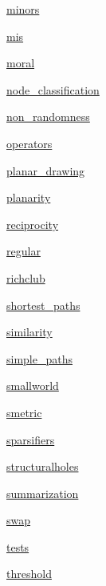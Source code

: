 \begin{DoxyCompactItemize}
\item 
 \hyperlink{namespacenetworkx_1_1algorithms_1_1minors}{minors}
\item 
 \hyperlink{namespacenetworkx_1_1algorithms_1_1mis}{mis}
\item 
 \hyperlink{namespacenetworkx_1_1algorithms_1_1moral}{moral}
\item 
 \hyperlink{namespacenetworkx_1_1algorithms_1_1node__classification}{node\+\_\+classification}
\item 
 \hyperlink{namespacenetworkx_1_1algorithms_1_1non__randomness}{non\+\_\+randomness}
\item 
 \hyperlink{namespacenetworkx_1_1algorithms_1_1operators}{operators}
\item 
 \hyperlink{namespacenetworkx_1_1algorithms_1_1planar__drawing}{planar\+\_\+drawing}
\item 
 \hyperlink{namespacenetworkx_1_1algorithms_1_1planarity}{planarity}
\item 
 \hyperlink{namespacenetworkx_1_1algorithms_1_1reciprocity}{reciprocity}
\item 
 \hyperlink{namespacenetworkx_1_1algorithms_1_1regular}{regular}
\item 
 \hyperlink{namespacenetworkx_1_1algorithms_1_1richclub}{richclub}
\item 
 \hyperlink{namespacenetworkx_1_1algorithms_1_1shortest__paths}{shortest\+\_\+paths}
\item 
 \hyperlink{namespacenetworkx_1_1algorithms_1_1similarity}{similarity}
\item 
 \hyperlink{namespacenetworkx_1_1algorithms_1_1simple__paths}{simple\+\_\+paths}
\item 
 \hyperlink{namespacenetworkx_1_1algorithms_1_1smallworld}{smallworld}
\item 
 \hyperlink{namespacenetworkx_1_1algorithms_1_1smetric}{smetric}
\item 
 \hyperlink{namespacenetworkx_1_1algorithms_1_1sparsifiers}{sparsifiers}
\item 
 \hyperlink{namespacenetworkx_1_1algorithms_1_1structuralholes}{structuralholes}
\item 
 \hyperlink{namespacenetworkx_1_1algorithms_1_1summarization}{summarization}
\item 
 \hyperlink{namespacenetworkx_1_1algorithms_1_1swap}{swap}
\item 
 \hyperlink{namespacenetworkx_1_1algorithms_1_1tests}{tests}
\item 
 \hyperlink{namespacenetworkx_1_1algorithms_1_1threshold}{threshold}

\end{DoxyCompactItemize}
